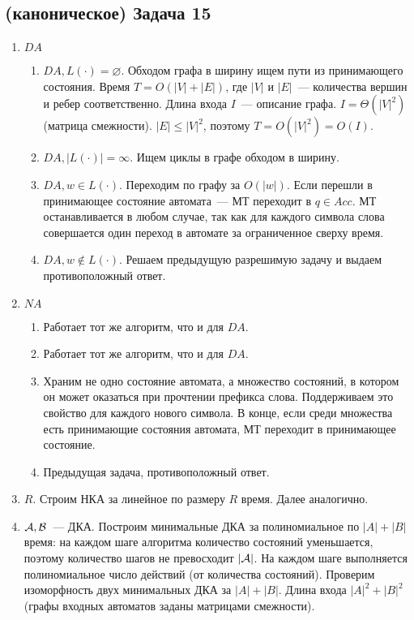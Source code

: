 \documentclass[a4paper]{article}
\def\A{{\cal A}}
\def\B{{\cal B}}
\begin{document}
\subsection*{(каноническое) Задача 15}
\begin{enumerate}
\item $DA$
\begin{enumerate}
\item $DA, L(\cdot)=\varnothing$. Обходом графа в ширину ищем пути из принимающего состояния. Время $T=O(|V|+|E|)$, где $|V|$ и $|E|$~--- количества вершин и ребер соответственно. Длина входа $I$~--- описание графа. $I=\Theta(|V|^2)$ (матрица смежности). $|E|\leqslant |V|^2$, поэтому $T=O(|V|^2)=O(I)$.
\item $DA, |L(\cdot)|=\infty$. Ищем циклы в графе обходом в ширину.
\item $DA, w\in L(\cdot)$. Переходим по графу за $O(|w|)$. Если перешли в принимающее состояние автомата~--- МТ переходит в $q\in Acc$. МТ останавливается в любом случае, так как для каждого символа слова совершается один переход в автомате за ограниченное сверху время.
\item $DA, w\notin L(\cdot)$. Решаем предыдущую разрешимую задачу и выдаем противоположный ответ.
\end{enumerate}
\item $NA$
\begin{enumerate}
\item Работает тот же алгоритм, что и для $DA$.
\item Работает тот же алгоритм, что и для $DA$.
\item Храним не одно состояние автомата, а множество состояний, в котором он может оказаться при прочтении префикса слова. Поддерживаем это свойство для каждого нового символа. В конце, если среди множества есть принимающие состояния автомата, МТ переходит в принимающее состояние.
\item Предыдущая задача, противоположный ответ.
\end{enumerate}
\item $R$. Строим НКА за линейное по размеру $R$ время. Далее аналогично.
\item $\A, \B$~--- ДКА. Построим минимальные ДКА за полиномиальное по $|A|+|B|$ время: на каждом шаге алгоритма количество состояний уменьшается, поэтому количество шагов не превосходит $|\A|$. На каждом шаге выполняется полиномиальное число действий (от количества состояний). Проверим изоморфность двух минимальных ДКА за $|A|+|B|$. Длина входа $|A|^2+|B|^2$ (графы входных автоматов заданы матрицами смежности).
\end{enumerate}
\end{document}
